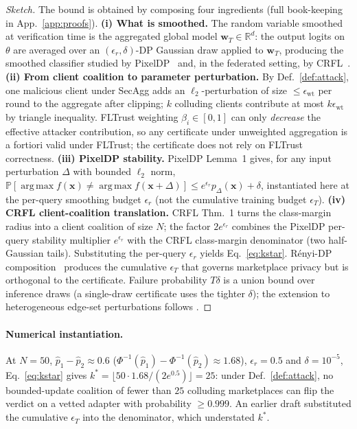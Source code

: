 \documentclass[11pt]{article}
\theoremstyle{plain}
\theoremstyle{definition}
\theoremstyle{remark}
\newcommand{\R}{\mathbb{R}}
\providecommand{\Prob}{}\renewcommand{\Prob}{\mathbb{P}}
\DeclareMathOperator*{\argmax}{arg\,max}
\begin{document}
\begin{proof}[Sketch]
The bound is obtained by composing four ingredients (full
book-keeping in App.~\ref{app:proofs}). \textbf{(i) What is
smoothed.} The random variable smoothed at verification time is
the aggregated global model $\mathbf{w}_T\!\in\!\R^d$: the output
logits on $\theta$ are averaged over an
$(\epsilon_r,\delta)$-DP Gaussian draw applied to $\mathbf{w}_T$,
producing the smoothed classifier studied by
PixelDP~\cite{lecuyer2019certified} and, in the federated
setting, by CRFL~\cite{xie2021crfl}. \textbf{(ii) From client
coalition to parameter perturbation.} By
Def.~\ref{def:attack}, one malicious client under SecAgg adds an
$\ell_2$-perturbation of size $\!\le\!\epsilon_{\mathrm{wt}}$
per round to the aggregate after clipping; $k$ colluding clients
contribute at most $k\epsilon_{\mathrm{wt}}$ by triangle
inequality. FLTrust weighting $\beta_i\!\in\![0,1]$ can only
\emph{decrease} the effective attacker contribution, so any
certificate under unweighted aggregation is a fortiori valid
under FLTrust; the certificate does not rely on FLTrust
correctness. \textbf{(iii) PixelDP stability.} PixelDP
Lemma~1 gives, for any input perturbation $\Delta$ with bounded
$\ell_2$ norm, $\Prob[\argmax f(\mathbf{x})\!\neq\!\argmax
f(\mathbf{x}+\Delta)]\!\le\!e^{\epsilon_r} p_\Delta(\mathbf{x})
+\delta$, instantiated here at the per-query smoothing budget
$\epsilon_r$ (not the cumulative training budget $\epsilon_T$).
\textbf{(iv) CRFL client-coalition translation.} CRFL Thm.~1
turns the class-margin radius into a client coalition of size
$N$; the factor $2 e^{\epsilon_r}$ combines the PixelDP per-query
stability multiplier $e^{\epsilon_r}$ with the CRFL class-margin
denominator (two half-Gaussian tails). Substituting the per-query
$\epsilon_r$ yields Eq.~\eqref{eq:kstar}. R\'enyi-DP
composition~\cite{mironov2017renyi,mironov2019sampled} produces
the cumulative $\epsilon_T$ that governs marketplace privacy but
is orthogonal to the certificate. Failure probability $T\delta$
is a union bound over inference draws (a single-draw certificate
uses the tighter $\delta$); the extension to heterogeneous
edge-set perturbations follows
\citet{wang2021certgnn,scholten2022randomized}.
\end{proof}

\paragraph{Numerical instantiation.}
At $N\!=\!50$, $\hat{p}_1\!-\!\hat{p}_2\!\approx\!0.6$
($\Phi^{-1}(\hat{p}_1)\!-\!\Phi^{-1}(\hat{p}_2)\!\approx\!1.68$),
$\epsilon_r\!=\!0.5$ and $\delta\!=\!10^{-5}$,
Eq.~\eqref{eq:kstar} gives
$k^*\!=\!\lfloor 50\!\cdot\!1.68/(2e^{0.5})\rfloor\!=\!25$: under
Def.~\ref{def:attack}, no bounded-update coalition of fewer than
$25$ colluding marketplaces can flip the verdict on a vetted
adapter with probability $\!\ge\!0.999$. An earlier draft
substituted the cumulative $\epsilon_T$ into the denominator,
which understated $k^*$.
\end{document}
